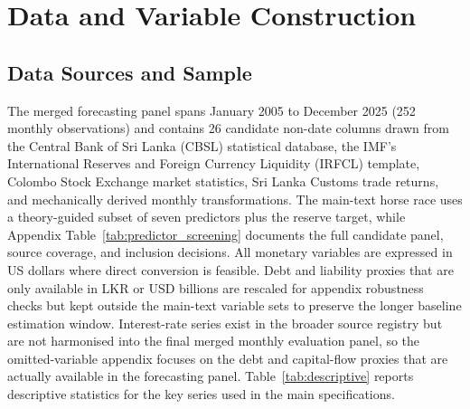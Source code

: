 \documentclass[12pt,a4paper]{article}
\begin{document}
\section{Data and Variable Construction}

\subsection{Data Sources and Sample}

The merged forecasting panel spans January 2005 to December 2025 (252 monthly observations) and contains 26 candidate non-date columns drawn from the Central Bank of Sri Lanka (CBSL) statistical database, the IMF's International Reserves and Foreign Currency Liquidity (IRFCL) template, Colombo Stock Exchange market statistics, Sri Lanka Customs trade returns, and mechanically derived monthly transformations. The main-text horse race uses a theory-guided subset of seven predictors plus the reserve target, while Appendix Table~\ref{tab:predictor_screening} documents the full candidate panel, source coverage, and inclusion decisions. All monetary variables are expressed in US dollars where direct conversion is feasible. Debt and liability proxies that are only available in LKR or USD billions are rescaled for appendix robustness checks but kept outside the main-text variable sets to preserve the longer baseline estimation window. Interest-rate series exist in the broader source registry but are not harmonised into the final merged monthly evaluation panel, so the omitted-variable appendix focuses on the debt and capital-flow proxies that are actually available in the forecasting panel. Table~\ref{tab:descriptive} reports descriptive statistics for the key series used in the main specifications.
\end{document}
